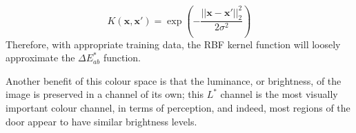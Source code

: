 \begin{equation}
K(\mathbf{x}, \mathbf{x'}) = \exp\left(-\frac{||\mathbf{x} - \mathbf{x'}||_2^2}{2\sigma^2}\right)
\end{equation}
Therefore, with appropriate training data, the RBF kernel function will loosely approximate the $\Delta E_{ab}^*$ function.

  Another benefit of this colour space is that the luminance, or brightness, of the image is preserved in a channel of its own; this $L^*$ channel is the most visually important colour channel, in terms of perception, and indeed, most regions of the door appear to have similar brightness levels.


